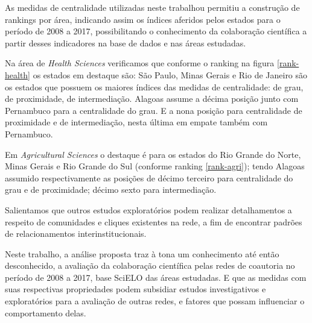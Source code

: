 
As medidas de centralidade utilizadas neste trabalhou permitiu a construção de rankings por área, indicando assim os índices aferidos pelos estados para o período de 2008 a 2017, possibilitando o conhecimento da colaboração científica a partir desses indicadores na base de dados e nas áreas estudadas.

Na área de \textit{Health Sciences} verificamos que conforme o ranking na figura \ref{rank-health} os estados em destaque são: São Paulo, Minas Gerais e Rio de Janeiro são os estados que possuem os maiores índices das medidas de centralidade: de grau, de proximidade, de intermediação. Alagoas assume a décima posição junto com Pernambuco para a centralidade do grau. E a nona posição para centralidade de proximidade e de intermediação, nesta última em empate também com Pernambuco.

Em \textit{Agricultural Sciences} o destaque é para os estados do Rio Grande do Norte, Minas Gerais e Rio Grande do Sul (conforme ranking \ref{rank-agri}); tendo Alagoas assumido respectivamente as posições de décimo terceiro para centralidade do grau e de proximidade; décimo sexto para intermediação. 

Salientamos que outros estudos exploratórios podem realizar detalhamentos a respeito de comunidades e cliques existentes na rede, a fim de encontrar padrões de relacionamentos interinstitucionais. 

Neste trabalho, a análise proposta traz à tona um conhecimento até então desconhecido, a avaliação da colaboração científica pelas redes de coautoria no período de 2008 a 2017, base SciELO das áreas estudadas. E que as medidas com suas respectivas propriedades podem subsidiar estudos investigativos e exploratórios para a avaliação de outras redes, e fatores que possam influenciar o comportamento delas.
